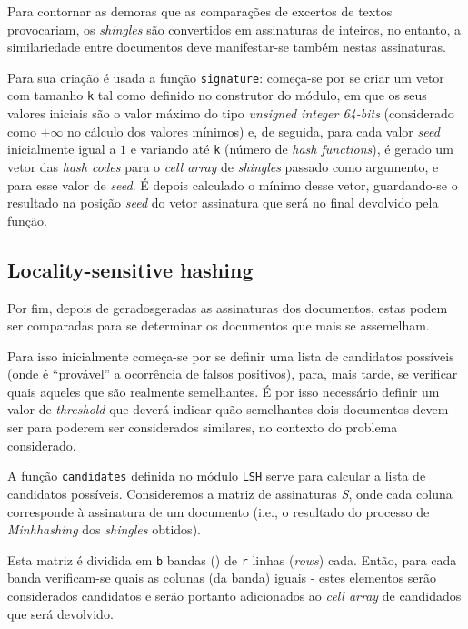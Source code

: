 \documentclass[a4paper,11pt,openright,oneside]{report}
\begin{document}
Para contornar as demoras que as comparações de excertos de textos provocariam, os \textit{shingles} são convertidos em assinaturas de inteiros, no entanto, a similariedade entre documentos deve manifestar-se também nestas assinaturas.

Para sua criação é usada a função \texttt{signature}: começa-se por se criar um vetor com tamanho \texttt{k} tal como definido no construtor do módulo, em que os seus valores iniciais são o valor máximo do tipo \textit{unsigned integer 64-bits} (considerado como $+\infty$ no cálculo dos valores mínimos) e, de seguida, para cada valor \textit{seed} inicialmente igual a $1$ e variando até \texttt{k} (número de \textit{hash functions}), é gerado um vetor das \textit{hash codes} para o \textit{cell array} de \textit{shingles} passado como argumento, e para esse valor de \textit{seed}. É depois calculado o mínimo desse vetor, guardando-se o resultado na posição \textit{seed} do vetor assinatura que será no final devolvido pela função.

\subsection{Locality-sensitive hashing}
\label{subsec.lsh}

Por fim, depois de geradosgeradas as assinaturas dos documentos, estas podem ser comparadas para se determinar os documentos que mais se assemelham.

Para isso inicialmente começa-se por se definir uma lista de candidatos possíveis (onde é ``provável'' a ocorrência de falsos positivos), para, mais tarde, se verificar quais aqueles que são realmente semelhantes. É por isso necessário definir um valor de \textit{threshold} que deverá indicar quão semelhantes dois documentos devem ser para poderem ser considerados similares, no contexto do problema considerado.

A função \texttt{candidates} definida no módulo \texttt{LSH} serve para calcular a lista de candidatos possíveis. Consideremos a matriz de assinaturas \textit{S}, onde cada coluna corresponde à assinatura de um documento (i.e., o resultado do processo de \textit{Minhhashing} dos \textit{shingles} obtidos).

Esta matriz é dividida em \texttt{b} bandas () de \texttt{r} linhas (\textit{rows}) cada. Então, para cada banda verificam-se quais as colunas (da banda) iguais - estes elementos serão considerados candidatos e serão portanto adicionados ao \textit{cell array} de candidados que será devolvido.
\end{document}
